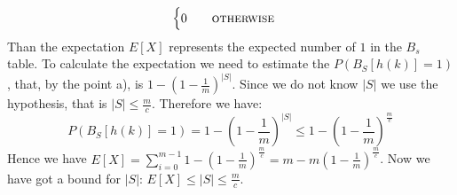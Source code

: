 \documentclass[a4paper]{article}
\begin{document}
\begin{itemize}
\begin{equation}
\begin{cases}
0 \qquad \textsc{otherwise}
\end{cases}
\nonumber
\end{equation}
Than the expectation $E[X]$ represents the expected number of $1$ in the $B_s$ table. To calculate the expectation we need to estimate the $P(B_S[h(k)]=1)$, that, by the point a), is $1-(1 - \frac{1}{m})^{|S|}$. Since we do not know $|S|$ we use the hypothesis, that is $|S|\leq \frac{m}{c}$. Therefore we have:
\begin{equation}
P(B_S[h(k)]=1)=1-(1 - \frac{1}{m})^{|S|} \leq 1-(1 - \frac{1}{m})^{\frac{m}{c}}
\nonumber
\end{equation}
Hence we have $E[X]= \sum_{i=0}^{m-1} 1-(1 - \frac{1}{m})^{\frac{m}{c}}=m-m(1 - \frac{1}{m})^{\frac{m}{c}}$. Now we have got a bound for $|S|$: $E[X]\leq|S|\leq \frac{m}{c}$.
\end{itemize}
\end{document}
